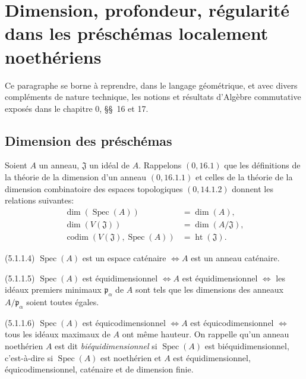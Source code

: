 \section{Dimension, profondeur, régularité dans les préschémas localement
noethériens}

Ce paragraphe se borne à reprendre, dans le langage géométrique, et avec
divers compléments de nature technique, les notions et résultats d'Algèbre
commutative exposés dans le chapitre 0, \S\S~16 et 17.

\subsection{Dimension des préschémas}

\begin{env}[5.1.1]
\label{IV.2.5.1.1-fr}
Soient $A$ un anneau, $\mathfrak J$ un idéal de $A$. Rappelons
$(0,16.1)$ que les définitions de la théorie de la dimension d'un anneau
$(0,16.1.1)$ et celles de la théorie de la dimension combinatoire des espaces
topologiques $(0,14.1.2)$ donnent les relations suivantes:
\begin{align}
\dim(\operatorname{Spec}(A))&=\dim(A),
\tag{5.1.1.1}\label{IV.2.5.1.1.1-fr}\\
\dim(V(\mathfrak J))&=\dim(A/\mathfrak J),
\tag{5.1.1.2}\label{IV.2.5.1.1.2-fr}\\
\operatorname{codim}(V(\mathfrak J),\operatorname{Spec}(A))
&=\operatorname{ht}(\mathfrak J).
\tag{5.1.1.3}\label{IV.2.5.1.1.3-fr}
\end{align}
\par\noindent\textup{(5.1.1.4)} $\operatorname{Spec}(A)$ est un espace
caténaire $\Longleftrightarrow A$ est un anneau caténaire.
\par\noindent\textup{(5.1.1.5)} $\operatorname{Spec}(A)$ est
équidimensionnel $\Longleftrightarrow A$ est équidimensionnel
$\Longleftrightarrow$ les idéaux premiers minimaux $\mathfrak p_\alpha$ de
$A$ sont tels que les dimensions des anneaux $A/\mathfrak p_\alpha$ soient
toutes égales.
\par\noindent\textup{(5.1.1.6)} $\operatorname{Spec}(A)$ est
équicodimensionnel $\Longleftrightarrow A$ est équicodimensionnel
$\Longleftrightarrow$ tous les idéaux maximaux de $A$ ont même hauteur.
On rappelle qu'un anneau noethérien $A$ est dit \emph{biéquidimensionnel} si
$\operatorname{Spec}(A)$ est biéquidimensionnel, c'est-à-dire si
$\operatorname{Spec}(A)$ est noethérien et $A$ est équidimensionnel,
équicodimensionnel, caténaire et de dimension finie.
\end{env}

